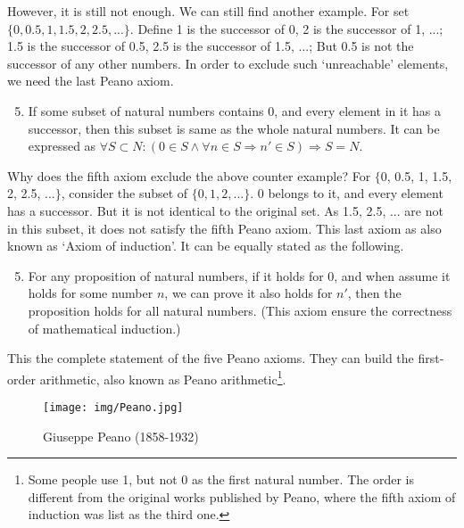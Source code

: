 \documentclass[UTF8]{article}
\begin{document}
However, it is still not enough. We can still find another example. For set $\{0, 0.5, 1, 1.5, 2, 2.5, ...\}$. Define 1 is the successor of 0, 2 is the successor of 1, ...; 1.5 is the successor of 0.5, 2.5 is the successor of 1.5, ...; But 0.5 is not the successor of any other numbers. In order to exclude such `unreachable' elements, we need the last Peano axiom.

\begin{enumerate}
  \setcounter{enumi}{4}
  \item If some subset of natural numbers contains 0, and every element in it has a successor, then this subset is same as the whole natural numbers. It can be expressed as $\forall S \subset N: (0 \in S \land \forall n \in S \Rightarrow n' \in S) \Rightarrow S = N$.
\end{enumerate}

Why does the fifth axiom exclude the above counter example? For $\{$0, 0.5, 1, 1.5, 2, 2.5, ...$\}$, consider the subset of $\{0, 1, 2, ...\}$. 0 belongs to it, and every element has a successor. But it is not identical to the original set. As 1.5, 2.5, ... are not in this subset, it does not satisfy the fifth Peano axiom. This last axiom as also known as `Axiom of induction'. It can be equally stated as the following.

\begin{enumerate}
  \setcounter{enumi}{4}
  \item For any proposition of natural numbers, if it holds for 0, and when assume it holds for some number $n$, we can prove it also holds for $n'$, then the proposition holds for all natural numbers. (This axiom ensure the correctness of mathematical induction.)
\end{enumerate}

This the complete statement of the five Peano axioms. They can build the first-order arithmetic, also known as Peano arithmetic\footnote{Some people use 1, but not 0 as the first natural number. The order is different from the original works published by Peano, where the fifth axiom of induction was list as the third one.}.

\begin{figure}[htbp]
 \centering
 \texttt{[image: img/Peano.jpg]}
 \caption{Giuseppe Peano (1858-1932)}
 \label{fig:Peano}
\end{figure}
\end{document}
